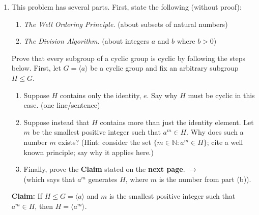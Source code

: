 \documentclass[fleqn,12pt]{article}
\newcommand{\<}{\ensuremath{\langle}}
\renewcommand{\>}{\ensuremath{\rangle}}
\newcommand{\N}{\ensuremath{\mathbb{N}}}
\begin{document}
\begin{enumerate}[{\bf 1.}]
\newpage
\item This problem has several parts.
First, state the following (without proof):
  \begin{enumerate}
  \item \emph{The Well Ordering Principle.} (about subsets of natural numbers)
    \vskip3cm

  \item \emph{The Division Algorithm.} (about integers $a$ and $b$ where $b>0$)
  \end{enumerate}
  \vskip3cm

Prove that every subgroup of a cyclic group is cyclic by following the
steps below.
First, let $G = \<a\>$ be a cyclic group and fix an arbitrary subgroup $H\leq G$.
  \begin{enumerate}
  \item Suppose $H$ contains only the identity, $e$. Say why $H$
    must be cyclic in this case. (one line/sentence)
    \vskip3cm
  \item Suppose instead that $H$ contains more than just the identity element. 
    Let $m$ be the smallest positive integer such that $a^m\in H$.  
    Why does such a number $m$ exists? (Hint: consider the set 
    $\{m \in \N: a^m \in H\}$; cite a well known principle; say
    why it applies here.)
    \vskip5cm
  \item Finally, prove the {\bf Claim} stated on the {\bf next page}. $\rightarrow$ \\
    (which says that $a^m$ generates $H$, where $m$ is the number from part (b)).
  \end{enumerate}

\newpage
{\bf Claim:} If $H\leq G = \<a\>$ and $m$ is the smallest positive integer such
that $a^m \in H$, then $H = \<a^m\>$.

\medskip


\hfill





\end{enumerate}
\end{document}
